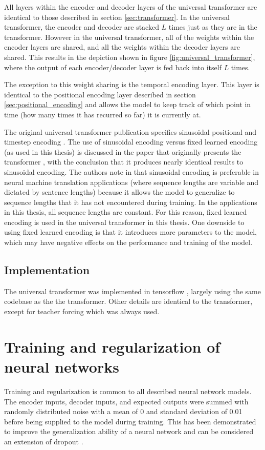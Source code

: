 All layers within the encoder and decoder layers of the universal transformer are identical to those described in section \ref{sec:transformer}.
In the universal transformer, the encoder and decoder are stacked $L$ times just as they are in the transformer.
However in the universal transformer, all of the weights within the encoder layers are shared, and all the weights within the decoder layers are shared.
This results in the depiction shown in figure \ref{fig:universal_transformer}, where the output of each encoder/decoder layer is fed back into itself $L$ times.

The exception to this weight sharing is the temporal encoding layer.
This layer is identical to the positional encoding layer described in section \ref{sec:positional_encoding} and allows the model to keep track of which point in time (how many times it has recurred so far) it is currently at.

The original universal transformer publication specifies sinusoidal positional and timestep encoding \cite{Dehghani2018}.
The use of sinusoidal encoding versus fixed learned encoding (as used in this thesis) is discussed in the paper that originally presents the transformer \cite{Vaswani2017}, with the conclusion that it produces nearly identical results to sinusoidal encoding.
The authors note in \cite{Vaswani2017} that sinusoidal encoding is preferable in neural machine translation applications (where sequence lengths are variable and dictated by sentence lengths) because it allows the model to generalize to sequence lengths that it has not encountered during training.
In the applications in this thesis, all sequence lengths are constant.
For this reason, fixed learned encoding is used in the universal transformer in this thesis.
One downside to using fixed learned encoding is that it introduces more parameters to the model, which may have negative effects on the performance and training of the model.


\subsection{Implementation}
The universal transformer was implemented in tensorflow \cite{tensorflow2015-whitepaper}, largely using the same codebase as the the transformer.
Other details are identical to the transformer, except for teacher forcing which was always used.


\section{Training and regularization of neural networks}
\label{train-reg}
Training and regularization is common to all described neural network models.
The encoder inputs, decoder inputs, and expected outputs were summed with randomly distributed noise with a mean of 0 and standard deviation of 0.01 before being supplied to the model during training.
This has been demonstrated to improve the generalization ability of a neural network \cite{Wang1999} \cite{Brown2003} and can be considered an extension of dropout \cite{srivastava14a}.

